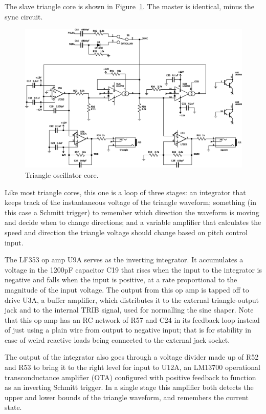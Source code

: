 The slave triangle core is shown in Figure~\ref{fig:tri-core}.  The master
is identical, minus the sync circuit.

\begin{figure}
\centering\includegraphics[width=\linewidth]{tri-core}\par
\caption{Triangle oscillator core.}\label{fig:tri-core}
\end{figure}

Like most triangle cores, this one is a loop of three stages:  an integrator
that keeps track of the instantaneous voltage of the triangle waveform;
something (in this case a Schmitt trigger) to remember which direction the
waveform is moving and decide when to change directions; and a variable
amplifier that calculates the speed and direction the triangle voltage
should change based on pitch control input.

The LF353 op amp U9A serves as the inverting integrator.  It accumulates a
voltage in the 1200pF capacitor C19 that rises when the input to the
integrator is negative and falls when the input is positive, at a rate
proportional to the magnitude of the input voltage.  The output from this op
amp is tapped off to drive U3A, a buffer amplifier, which distributes it to
the external triangle-output jack and to the internal TRIB signal, used for
normalling the sine shaper.  Note that this op amp has an RC network of R57
and C24 in its feedback loop instead of just using a plain wire from output
to negative input; that is for stability in case of weird reactive loads
being connected to the external jack socket.

The output of the integrator also goes through a voltage divider made up of
R52 and R53 to bring it to the right level for input to U12A, an LM13700
operational transconductance amplifier (OTA) configured with positive
feedback to function as an inverting Schmitt trigger.  In a single stage
this amplifier both detects the upper and lower bounds of the triangle
waveform, and remembers the current state.

